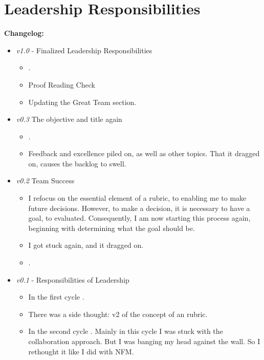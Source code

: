 \chapter{Leadership Responsibilities}
\setcounter{section}{0}

\textbf{Changelog:}\\
\begin{itemize}
	\item \textit{v1.0} - Finalized Leadership Responsibilities
	\begin{itemize}
		\item {}.
		\item Proof Reading Check
		\item Updating the Great Team section.
	\end{itemize}
	\item \textit{v0.3} The objective and title again
	\begin{itemize}
		\item {}.
		\item Feedback and excellence piled on, as well as other topics. That it dragged on, causes the backlog to swell.
	\end{itemize}
	\item \textit{v0.2} Team Success
	\begin{itemize}
		\item I refocus on the essential element of a rubric, to enabling me to make future decisions. However, to make a decision, it is necessary to have a goal, to evaluated. Consequently, I am now starting this process again, beginning with determining what the goal should be.
		\item I got stuck again, and it dragged on.
		\item {}.
	\end{itemize}
	\item \textit{v0.1} - Responsibilities of Leadership
	\begin{itemize}
		\item In the first cycle 
		.
		\item There was a side thought: v2 of the concept of an rubric.
		\item In the second cycle 
		. Mainly in this cycle I was stuck with the collaboration approach. But I was banging my head against the wall. So I rethought it like I did with NFM.
	\end{itemize}
\end{itemize}

